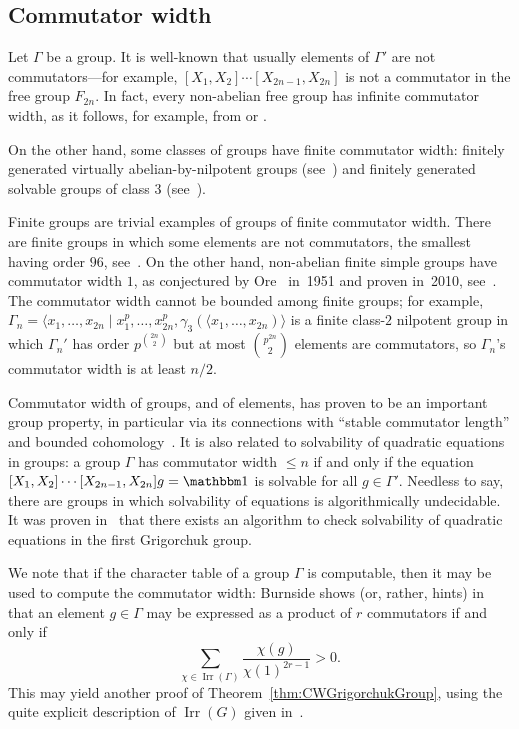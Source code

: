 \documentclass[a4paper,11pt]{amsart}
\begin{document}
\subsection{Commutator width}
Let $\Gamma$ be a group. It is well-known that usually elements of
$\Gamma'$ are not commutators---for example,
$[X_1,X_2]\cdots[X_{2n-1},X_{2n}]$ is not a commutator in the free
group $F_{2n}$. In fact, every non-abelian free group has infinite
commutator width, 
as it follows, for example, from \cite{Rhemtulla:CommutatorsF2} or \cite{Culler:Surfaces}.

On the other hand, some classes of groups have finite commutator width: finitely generated virtually abelian-by-nilpotent groups 
(see~\cite{Segal:Words}) and finitely generated solvable groups of class $3$ (see~\cite{Rhemtulla:Commutators}).


Finite groups are trivial examples of groups of
finite commutator width.  There are finite groups in which some
elements are not commutators, the smallest having order $96$,
see~\cite{Guralnick:Group96}. On the other hand, non-abelian finite
simple groups have commutator width $1$, as conjectured by
Ore~\cite{Ore:Commutators} in~1951 and proven in~2010,
see~\cite{Liebeck:OreConjecture}. The commutator width cannot be
bounded among finite groups; for example,
$\Gamma_n=\langle x_1,\dots,x_{2n}\mid
x_1^p,\dots,x_{2n}^p,\gamma_3(\langle x_1,\dots,x_{2n})\rangle$ is a
finite class-$2$ nilpotent group in which $\Gamma_n'$ has order
$p^{\binom{2n}2}$ but at most $\binom{p^{2n}}2$ elements are
commutators, so $\Gamma_n$'s commutator width is at least $n/2$.

Commutator width of groups, and of elements, has proven to be an
important group property, in particular via its connections with
``stable commutator length'' and bounded
cohomology~\cite{Calegari:SCL}. It is also related to solvability of
quadratic equations in groups: a group $\Gamma$ has commutator width
$\le n$ if and only if the equation
$[X_1,X_2]\cdots[X_{2n-1},X_{2n}]g=\id$ is solvable for all
$g\in\Gamma'$. Needless to say, there are groups in which solvability
of equations is algorithmically undecidable. It was proven
in~\cite{Lysenok-Miasnikov-Ushakov:QuadraticEquationsInGrig} that 
there exists an algorithm to check solvability of quadratic equations  in the first Grigorchuk group.

We note that if the character table of a group $\Gamma$ is computable,
then it may be used to compute the commutator width: Burnside shows
(or, rather, hints) in~\cite[\S238, Ex. 7]{Burnside:Groups} that an
element $g\in\Gamma$ may be expressed as a product of $r$ commutators
if and only if
\[\sum_{\chi\in\operatorname{Irr}(\Gamma)}\frac{\chi(g)}{\chi(1)^{2r-1}}>0.\]
This may yield another proof of Theorem~\ref{thm:CWGrigorchukGroup},
using the quite explicit description of $\operatorname{Irr}(G)$ given
in~\cite{Bartholdi:RepresentationZetaFunctions}.
\end{document}
